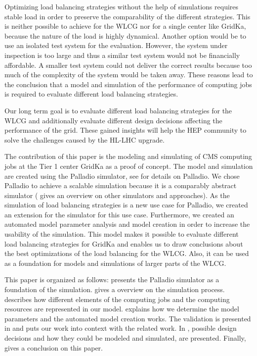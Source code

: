 \documentclass{webofc}
\begin{document}
Optimizing load balancing strategies without the help of simulations requires stable load in order to preserve the comparability of the different strategies. This is neither possible to achieve for the WLCG nor for a single center like GridKa, because the nature of the load is highly dynamical. Another option would be to use an isolated test system for the evaluation. However, the system under inspection is too large and thus a similar test system would not be financially affordable. A smaller test system could not deliver the correct results because too much of the complexity of the system would be taken away.
These reasons lead to the conclusion that a model and simulation of the performance of computing jobs is required to evaluate different load balancing strategies.

Our long term goal is to evaluate different load balancing strategies for the WLCG and additionally evaluate different design decisions affecting the performance of the grid. These gained insights will help the HEP community to solve the challenges caused by the HL-LHC upgrade.

The contribution of this paper is the modeling and simulating of CMS computing jobs at the Tier 1 center GridKa as a proof of concept.
The model and simulation are created using the Palladio simulator, see  for details on Palladio. We chose Palladio to achieve a scalable simulation because it is a comparably abstract simulator ( gives an overview on other simulators and approaches).
As the simulation of load balancing strategies is a new use case for Palladio, we created an extension for the simulator for this use case. Furthermore, we created an automated model parameter analysis and model creation in order to increase the usability of the simulation.
This model makes it possible to evaluate different load balancing strategies for GridKa and enables us to draw conclusions about the best optimizations of the load balancing for the WLCG. Also, it can be used as a foundation for models and simulations of larger parts of the WLCG.


This paper is organized as follows:  presents the Palladio simulator as a foundation of the simulation.  gives a overview on the simulation process.  describes how different elements of the computing jobs and the computing resources are represented in our model.  explains how we determine the model parameters and the automated model creation works. The validation is presented in  and  puts our work into context with the related work. In , possible design decisions and how they could be modeled and simulated, are presented. Finally,  gives a conclusion on this paper.
\end{document}
